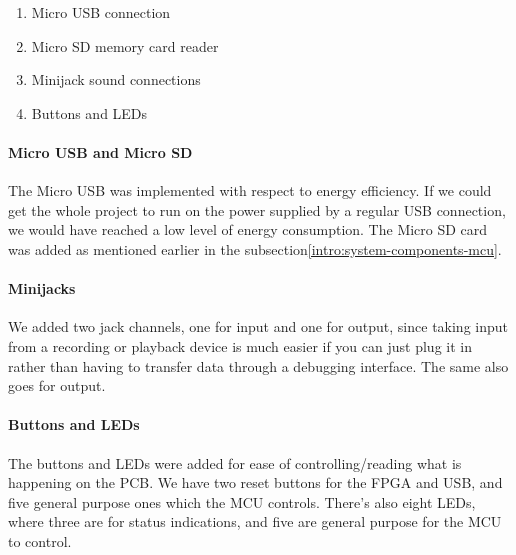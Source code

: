 \begin{enumerate}
	\item Micro USB connection
	\item Micro SD memory card reader
	\item Minijack sound connections
	\item Buttons and LEDs
\end{enumerate}

\paragraph{Micro USB and Micro SD}
The Micro USB was implemented with respect to energy efficiency. If we could get
the whole project to run on the power supplied by a regular USB connection, we
would have reached a low level of energy consumption. The Micro SD card was
added as mentioned earlier in the subsection\ref{intro:system-components-mcu}.

\paragraph{Minijacks}
We added two jack channels, one for input and one for output, since taking input
from a recording or playback device is much easier if you can just plug it in
rather than having to transfer data through a debugging interface. The same also
goes for output.

\paragraph{Buttons and LEDs}
The buttons and LEDs were added for ease of controlling/reading what is
happening on the PCB. We have two reset buttons for the FPGA and USB, and five
general purpose ones which the MCU controls. There's also eight LEDs, where
three are for status indications, and five are general purpose for the MCU to
control.
